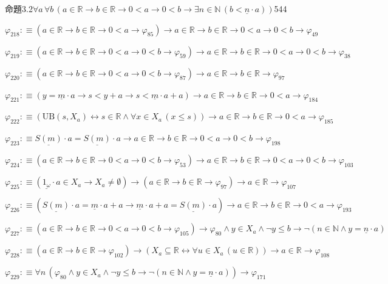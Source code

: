 \begin{fullproof}{命題3.2}{$\forall a\,\forall b\,(a \in \mathbb{R} \to b \in \mathbb{R} \to 0 < a \to 0 < b \to \exists n \in \mathbb{N}\,(b < \underline{n} \cdot a))$}{544}
\begin{abbrevlist}
\item $\varphi_{218} :\equiv (a \in \mathbb{R} \to b \in \mathbb{R} \to 0 < a \to \varphi_{85}) \to a \in \mathbb{R} \to b \in \mathbb{R} \to 0 < a \to 0 < b \to \varphi_{49}$
\item $\varphi_{219} :\equiv (a \in \mathbb{R} \to b \in \mathbb{R} \to 0 < a \to 0 < b \to \varphi_{59}) \to a \in \mathbb{R} \to b \in \mathbb{R} \to 0 < a \to 0 < b \to \varphi_{38}$
\item $\varphi_{220} :\equiv (a \in \mathbb{R} \to b \in \mathbb{R} \to 0 < a \to 0 < b \to \varphi_{87}) \to a \in \mathbb{R} \to b \in \mathbb{R} \to \varphi_{97}$
\item $\varphi_{221} :\equiv (y = \underline{m} \cdot a \to s < y + a \to s < \underline{m} \cdot a + a) \to a \in \mathbb{R} \to b \in \mathbb{R} \to 0 < a \to \varphi_{184}$
\item $\varphi_{222} :\equiv (\mathrm{UB}(s,X_{a}) \leftrightarrow s \in \mathbb{R} \land \forall x \in X_{a}\,(x \leq s)) \to a \in \mathbb{R} \to b \in \mathbb{R} \to 0 < a \to \varphi_{185}$
\item $\varphi_{223} :\equiv \underline{S(m)} \cdot a = \underline{S(m)} \cdot a \to a \in \mathbb{R} \to b \in \mathbb{R} \to 0 < a \to 0 < b \to \varphi_{198}$
\item $\varphi_{224} :\equiv (a \in \mathbb{R} \to b \in \mathbb{R} \to 0 < a \to 0 < b \to \varphi_{53}) \to a \in \mathbb{R} \to b \in \mathbb{R} \to 0 < a \to 0 < b \to \varphi_{103}$
\item $\varphi_{225} :\equiv (\underline{1_{\omega}} \cdot a \in X_{a} \to X_{a} \neq \emptyset) \to (a \in \mathbb{R} \to b \in \mathbb{R} \to \varphi_{97}) \to a \in \mathbb{R} \to \varphi_{107}$
\item $\varphi_{226} :\equiv (\underline{S(m)} \cdot a = \underline{m} \cdot a + a \to \underline{m} \cdot a + a = \underline{S(m)} \cdot a) \to a \in \mathbb{R} \to b \in \mathbb{R} \to 0 < a \to \varphi_{193}$
\item $\varphi_{227} :\equiv (a \in \mathbb{R} \to b \in \mathbb{R} \to 0 < a \to 0 < b \to \varphi_{105}) \to \varphi_{80} \land y \in X_{a} \land \neg y \leq b \to \neg (n \in \mathbb{N} \land y = \underline{n} \cdot a)$
\item $\varphi_{228} :\equiv (a \in \mathbb{R} \to b \in \mathbb{R} \to \varphi_{102}) \to (X_{a} \subseteq \mathbb{R} \leftrightarrow \forall u \in X_{a}\,(u \in \mathbb{R})) \to a \in \mathbb{R} \to \varphi_{108}$
\item $\varphi_{229} :\equiv \forall n\,(\varphi_{80} \land y \in X_{a} \land \neg y \leq b \to \neg (n \in \mathbb{N} \land y = \underline{n} \cdot a)) \to \varphi_{171}$

\end{abbrevlist}
\end{fullproof}
